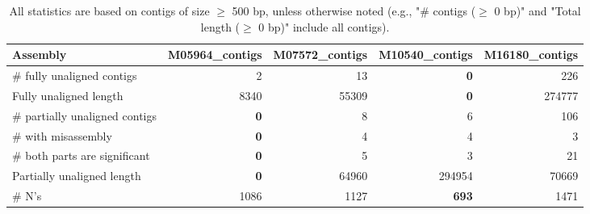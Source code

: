 \documentclass[12pt,a4paper]{article}
\begin{document}
\begin{table}[ht]
\begin{center}
\caption{All statistics are based on contigs of size $\geq$ 500 bp, unless otherwise noted (e.g., "\# contigs ($\geq$ 0 bp)" and "Total length ($\geq$ 0 bp)" include all contigs).}
\begin{tabular}{|l*{4}{|r}|}
\hline
Assembly & M05964\_contigs & M07572\_contigs & M10540\_contigs & M16180\_contigs \\ \hline
\# fully unaligned contigs & 2 & 13 & {\bf 0} & 226 \\ \hline
Fully unaligned length & 8340 & 55309 & {\bf 0} & 274777 \\ \hline
\# partially unaligned contigs & {\bf 0} & 8 & 6 & 106 \\ \hline
\hspace{5mm}\# with misassembly & {\bf 0} & 4 & 4 & 3 \\ \hline
\hspace{5mm}\# both parts are significant & {\bf 0} & 5 & 3 & 21 \\ \hline
Partially unaligned length & {\bf 0} & 64960 & 294954 & 70669 \\ \hline
\# N's & 1086 & 1127 & {\bf 693} & 1471 \\ \hline
\end{tabular}
\end{center}
\end{table}
\end{document}
